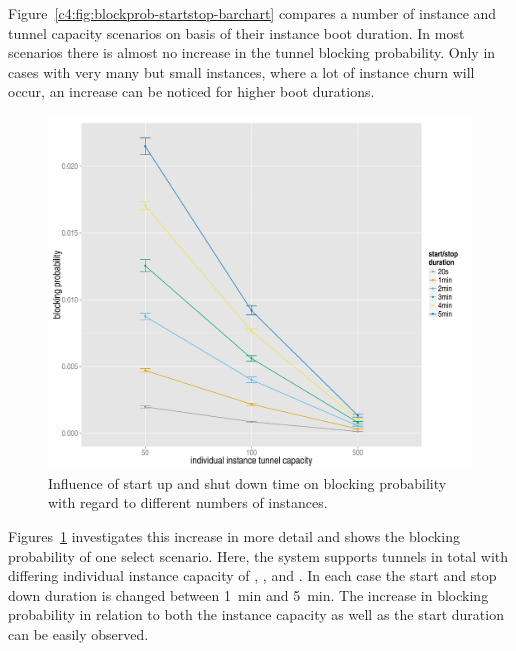 Figure~\ref{c4:fig:blockprob-startstop-barchart} compares a number of instance and tunnel capacity scenarios on basis of their instance boot duration. In most scenarios there is almost no increase in the tunnel blocking probability. Only in cases with very many but small instances, where a lot of instance churn will occur, an increase can be noticed for higher boot durations.

\begin{figure}[htb]
	\centering
	\includegraphics[width=1.0\textwidth]{images/compare-maxinstances-block.pdf}
	\caption{Influence of start up and shut down time on blocking probability with regard to different numbers of instances.}
\label{c4:fig:compare_maxinstances_block}
\end{figure}


Figures~\ref{c4:fig:compare_maxinstances_block}%
investigates this increase in more detail and shows the blocking probability of one select scenario. Here, the system supports  tunnels in total with differing individual instance capacity of , , and . In each case the start and stop down duration is changed between \SI{1}{\minute} and \SI{5}{\minute}. The increase in blocking probability in relation to both the instance capacity as well as the start duration can be easily observed.


